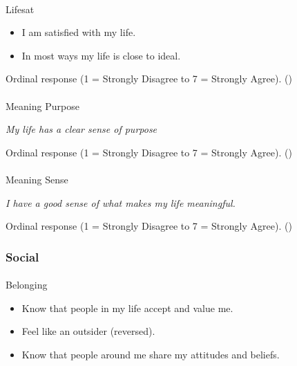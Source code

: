 \documentclass[
  single column]{article}
\makeatletter
\let\oldparagraph\paragraph
\renewcommand{\paragraph}{
    \@ifstar
      \xxxParagraphStar
      \xxxParagraphNoStar
  }
\newcommand{\xxxParagraphStar}[1]{\oldparagraph*{#1}\mbox{}}
\newcommand{\xxxParagraphNoStar}[1]{\oldparagraph{#1}\mbox{}}
\providecommand{\tightlist}{%
  \setlength{\itemsep}{0pt}\setlength{\parskip}{0pt}}\usepackage{longtable,booktabs,array}
\makeatother
\begin{document}
\paragraph{Lifesat}\label{lifesat}

\begin{itemize}
\tightlist
\item
  I am satisfied with my life.
\item
  In most ways my life is close to ideal.
\end{itemize}

Ordinal response (1 = Strongly Disagree to 7 = Strongly Agree).
()

\paragraph{Meaning Purpose}\label{meaning-purpose-1}

\emph{My life has a clear sense of purpose}

Ordinal response (1 = Strongly Disagree to 7 = Strongly Agree).
()

\paragraph{Meaning Sense}\label{meaning-sense-1}

\emph{I have a good sense of what makes my life meaningful.}

Ordinal response (1 = Strongly Disagree to 7 = Strongly Agree).
()

\subsubsection{Social}\label{social}

\paragraph{Belonging}\label{belonging-1}

\begin{itemize}
\tightlist
\item
  Know that people in my life accept and value me.
\item
  Feel like an outsider (reversed).
\item
  Know that people around me share my attitudes and beliefs.
\end{itemize}
\end{document}
